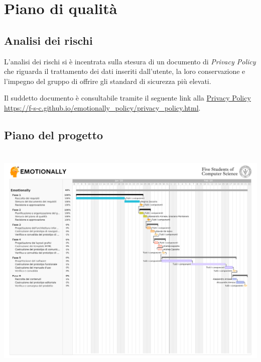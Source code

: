 
\chapter{Piano di qualità}\label{chap:piano-qualita}

\section{Analisi dei rischi}\label{sec:analisi-rischi}
L'analisi dei rischi si è incentrata sulla stesura di un documento di 
\textit{Privacy Policy} che riguarda il trattamento dei dati inseriti 
dall'utente, la loro conservazione e l'impegno del gruppo di offrire gli 
standard di sicurezza più elevati. 

Il suddetto documento è consultabile tramite il seguente link alla 
\href{https://f-s-c.github.io/emotionally_policy/privacy_policy.html}{Privacy 
Policy} \url{https://f-s-c.github.io/emotionally_policy/privacy_policy.html}.

\section{Piano del progetto}\label{sec:piano-progetto}
\includegraphics[height=11.5cm, frame]{images/gantt.png}

